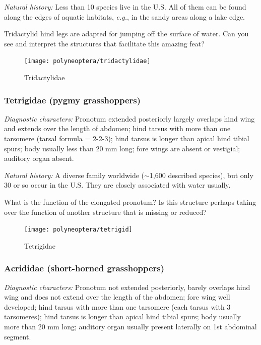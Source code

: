 \noindent{}\textit{Natural history:} Less than 10 species live in the U.S. All of them can be found along the edges of aquatic habitats, \textit{e.g.}, in the sandy areas along a lake edge.\vspace{3mm}

\begin{theo}
{}Tridactylid hind legs are adapted for jumping off the surface of water. Can you see and interpret the structures that facilitate this amazing feat?
\end{theo} 

\begin{figure}[ht!]
  \centering
    \texttt{[image: polyneoptera/tridactylidae]}
  \caption{Tridactylidae \citep[redrawn from][Fig. 5:1]{bhlitem126080aquatic}}
  \label{fig:tridact}
\end{figure}

\subsubsection{Tetrigidae (pygmy grasshoppers)}
\noindent{}\textit{Diagnostic characters:} Pronotum extended posteriorly largely overlaps hind wing and extends over the length of abdomen; hind tarsus with more than one tarsomere (tarsal formula = 2-2-3); hind tarsus is longer than apical hind tibial spurs; body usually less than 20 mm long; fore wings are absent or vestigial; auditory organ absent.\vspace{3mm}

\noindent{}\textit{Natural history:} A diverse family worldwide ($\sim$1,600 described species), but only 30 or so occur in the U.S. They are closely associated with water usually.\vspace{3mm}

\begin{theo}
{}What is the function of the elongated pronotum? Is this structure perhaps taking over the function of another structure that is missing or reduced?
\end{theo}

\begin{figure}[ht!]
  \centering
     \texttt{[image: polyneoptera/tetrigid]}
  \caption{Tetrigidae \citep[modified from][Figs. 195--196]{kellogg1906american}}
  \label{fig:tetrig}
\end{figure}

\subsubsection{Acrididae (short-horned grasshoppers)}
\noindent{}\textit{Diagnostic characters:} Pronotum not extended posteriorly, barely overlaps hind wing and does not extend over the length of the abdomen; fore wing well developed; hind tarsus with more than one tarsomere (each tarsus with 3 tarsomeres); hind tarsus is longer than apical hind tibial spurs; body usually more than 20 mm long; auditory organ usually present laterally on 1st abdominal segment.\vspace{3mm}

